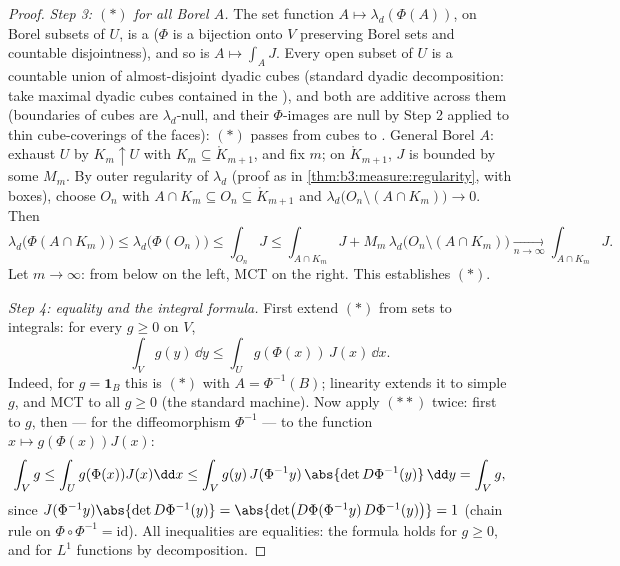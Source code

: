 \begin{proof}
\emph{Step 3: $(*)$ for all Borel $A$.} The set function $A
\mapsto \lambda_d(\Phi(A))$, on Borel subsets of $U$, is a
 ($\Phi$ is a bijection onto $V$ preserving Borel sets
and countable disjointness), and so is $A \mapsto \int_AJ$.
Every open subset of $U$ is a countable union of
almost-disjoint dyadic  cubes (standard dyadic
decomposition: take maximal dyadic cubes contained in the ), and both  are additive across them (boundaries
of cubes are $\lambda_d$-null, and their $\Phi$-images are
null by Step 2 applied to thin cube-coverings of the faces):
$(*)$ passes from cubes to . General Borel $A$:
exhaust $U$ by  $K_m \uparrow U$ with $K_m \subseteq
\mathring K_{m+1}$, and fix $m$; on $\mathring K_{m+1}$, $J$
is bounded by some $M_m$. By outer regularity of $\lambda_d$
(proof as in \cref{thm:b3:measure:regularity}, with boxes),
choose  $O_n$ with $A \cap K_m \subseteq O_n
\subseteq \mathring K_{m+1}$ and $\lambda_d\bigl(O_n \setminus
(A\cap K_m)\bigr) \to 0$. Then
\[
\lambda_d\bigl(\Phi(A\cap K_m)\bigr) \leq
\lambda_d\bigl(\Phi(O_n)\bigr) \leq \int_{O_n}J
\leq \int_{A\cap K_m}J + M_m\,\lambda_d\bigl(O_n\setminus(A\cap
K_m)\bigr) \xrightarrow[n\to\infty]{} \int_{A\cap K_m}J .
\]
Let $m \to \infty$:  from below on the left, MCT on
the right. This establishes $(*)$.

\emph{Step 4: equality and the integral formula.} First
extend $(*)$ from sets to integrals: for every  $g
\geq 0$ on $V$,
\[
\int_V g(y)\,\dd y \leq \int_U g(\Phi(x))\,J(x)\,\dd x .
\tag{$**$}
\]
Indeed, for $g = \mathbf 1_B$ this is $(*)$ with $A =
\Phi^{-1}(B)$; linearity extends it to simple $g$, and MCT to
all $g \geq 0$ (the standard machine). Now apply $(**)$ twice:
first to $g$, then --- for the diffeomorphism $\Phi^{-1}$ ---
to the function $x \mapsto g(\Phi(x))J(x)$:
\[
\int_Vg \leq \int_U g(\Phi(x))J(x)\dd x
\leq \int_V g(y)\,J(\Phi^{-1}y)\,\abs{\det
D\Phi^{-1}(y)}\,\dd y = \int_V g ,
\]
since $J(\Phi^{-1}y)\abs{\det D\Phi^{-1}(y)} = \abs{\det\bigl(
D\Phi(\Phi^{-1}y)\,D\Phi^{-1}(y)\bigr)} = 1$ (chain rule on
$\Phi\circ\Phi^{-1} = \mathrm{id}$). All inequalities are
equalities: the formula holds for $g \geq 0$, and for $L^1$
functions by decomposition.
\end{proof}


